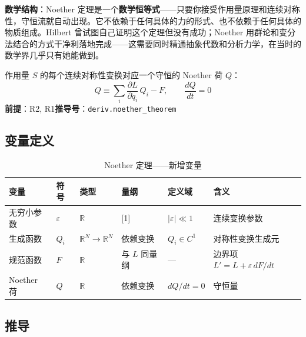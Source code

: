 \textbf{数学结构}：Noether 定理是一个\textbf{数学恒等式}——只要你接受作用量原理和连续对称性，守恒流就自动出现。它不依赖于任何具体的力的形式、也不依赖于任何具体的物质组成。Hilbert 曾试图自己证明这个定理但没有成功；Noether 用群论和变分法结合的方式干净利落地完成——这需要同时精通抽象代数和分析力学，在当时的数学界几乎只有她能做到。

\begin{lawbox}[Noether 定理]
  作用量 $S$ 的每个连续对称性变换对应一个守恒的 Noether 荷 $Q$：
  \[
  Q \equiv \sum_i \frac{\partial L}{\partial \dot{q}_i}\,Q_i - F, \qquad \frac{dQ}{dt} = 0
  \]
  \textbf{前提}：R2, R1\quad \textbf{推导号}：\texttt{deriv.noether\_theorem}
\end{lawbox}

\subsection{变量定义}

\begin{table}[h]
\centering\small
\begin{tabular}{p{1.8cm}p{1.5cm}p{2cm}p{1.5cm}p{3cm}p{3.5cm}}
\toprule
\textbf{变量} & \textbf{符号} & \textbf{类型} & \textbf{量纲} & \textbf{定义域} & \textbf{含义} \\
\midrule
无穷小参数 & $\varepsilon$ & $\mathbb{R}$ & [1] & $|\varepsilon| \ll 1$ & 连续变换参数 \\
生成函数 & $Q_i$ & $\mathbb{R}^N \to \mathbb{R}^N$ & 依赖变换 & $Q_i \in C^1$ & 对称性变换生成元 \\
规范函数 & $F$ & $\mathbb{R}$ & 与 $L$ 同量纲 & — & 边界项 $L' = L + \varepsilon\,dF/dt$ \\
Noether 荷 & $Q$ & $\mathbb{R}$ & 依赖变换 & $dQ/dt = 0$ & 守恒量 \\
\bottomrule
\end{tabular}
\caption{Noether 定理——新增变量}
\end{table}

\subsection{推导}

